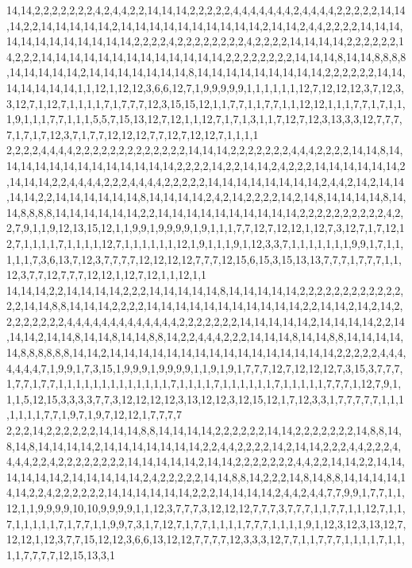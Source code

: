 14,14,2,2,2,2,2,2,2,4,2,4,4,2,2,14,14,14,2,2,2,2,2,4,4,4,4,4,4,4,2,4,4,4,4,2,2,2,2,2,14,14,14,2,2,14,14,14,14,14,2,14,14,14,14,14,14,14,14,14,14,2,14,14,2,4,4,2,2,2,2,14,14,14,14,14,14,14,14,14,14,14,14,2,2,2,2,4,2,2,2,2,2,2,2,2,4,2,2,2,2,14,14,14,14,2,2,2,2,2,2,14,2,2,2,14,14,14,14,14,14,14,14,14,14,14,14,14,2,2,2,2,2,2,2,2,14,14,14,8,14,14,8,8,8,8,14,14,14,14,14,2,14,14,14,14,14,14,14,8,14,14,14,14,14,14,14,14,14,2,2,2,2,2,2,14,14,14,14,14,14,14,1,1,12,1,12,12,3,6,6,12,7,1,9,9,9,9,9,1,1,1,1,1,1,12,7,12,12,12,3,7,12,3,3,12,7,1,12,7,1,1,1,1,7,1,7,7,7,12,3,15,15,12,1,1,7,7,1,1,7,7,1,1,12,12,1,1,1,7,7,1,7,1,1,1,9,1,1,1,7,7,1,1,1,5,5,7,15,13,12,7,12,1,1,12,7,1,7,1,3,1,1,7,12,7,12,3,13,3,3,12,7,7,7,7,1,7,1,7,12,3,7,1,7,7,12,12,12,7,7,12,7,12,12,7,1,1,1,1
2,2,2,2,4,4,4,4,2,2,2,2,2,2,2,2,2,2,2,2,2,14,14,14,2,2,2,2,2,2,2,4,4,4,2,2,2,2,14,14,8,14,14,14,14,14,14,14,14,14,14,14,14,14,2,2,2,2,14,2,2,14,14,2,4,2,2,2,14,14,14,14,14,14,2,14,14,14,2,2,4,4,4,4,2,2,2,4,4,4,4,2,2,2,2,2,14,14,14,14,14,14,14,14,2,4,4,2,14,2,14,14,14,14,2,2,14,14,14,14,14,14,8,14,14,14,14,2,4,2,14,2,2,2,2,14,2,14,8,14,14,14,14,8,14,14,8,8,8,8,14,14,14,14,14,14,2,2,14,14,14,14,14,14,14,14,14,14,2,2,2,2,2,2,2,2,2,2,4,2,2,7,9,1,1,9,12,13,15,12,1,1,9,9,1,9,9,9,9,1,9,1,1,1,7,7,12,7,12,12,1,12,7,3,12,7,1,7,12,12,7,1,1,1,1,7,1,1,1,1,12,7,1,1,1,1,1,1,12,1,9,1,1,1,9,1,12,3,3,7,1,1,1,1,1,1,1,9,9,1,7,1,1,1,1,1,7,3,6,13,7,12,3,7,7,7,7,12,12,12,12,7,7,7,12,15,6,15,3,15,13,13,7,7,7,1,7,7,7,1,1,12,3,7,7,12,7,7,7,12,12,1,12,7,12,1,1,12,1,1
14,14,14,2,2,14,14,14,14,2,2,2,14,14,14,14,14,8,14,14,14,14,14,2,2,2,2,2,2,2,2,2,2,2,2,2,2,14,14,8,8,14,14,14,2,2,2,2,14,14,14,14,14,14,14,14,14,14,14,2,2,14,14,2,14,2,14,2,2,2,2,2,2,2,2,4,4,4,4,4,4,4,4,4,4,4,4,4,2,2,2,2,2,2,2,14,14,14,14,14,2,14,14,14,14,2,2,14,14,14,2,14,14,8,14,14,8,14,14,8,8,14,2,2,4,4,4,2,2,2,14,14,14,8,14,14,8,8,14,14,14,14,14,8,8,8,8,8,8,14,14,2,14,14,14,14,14,14,14,14,14,14,14,14,14,14,14,14,2,2,2,2,2,4,4,4,4,4,4,4,7,1,9,9,1,7,3,15,1,9,9,9,1,9,9,9,9,1,1,9,1,9,1,7,7,7,12,7,12,12,12,7,3,15,3,7,7,7,1,7,7,1,7,7,1,1,1,1,1,1,1,1,1,1,1,1,1,7,1,1,1,1,7,1,1,1,1,1,1,7,1,1,1,1,1,7,7,7,1,12,7,9,1,1,1,5,12,15,3,3,3,3,7,7,3,12,12,12,12,3,13,12,12,3,12,15,12,1,7,12,3,3,1,7,7,7,7,7,1,1,1,1,1,1,1,7,7,1,9,7,1,9,7,12,12,1,7,7,7,7
2,2,2,14,2,2,2,2,2,2,14,14,14,8,8,14,14,14,14,2,2,2,2,2,2,14,14,2,2,2,2,2,2,2,14,8,8,14,8,14,8,14,14,14,14,2,14,14,14,14,14,14,14,2,2,4,4,2,2,2,2,14,2,14,14,2,2,2,4,4,2,2,2,4,4,4,4,2,2,4,2,2,2,2,2,2,2,2,14,14,14,14,14,2,14,14,2,2,2,2,2,2,2,4,4,2,2,14,14,2,2,14,14,14,14,14,14,2,14,14,14,14,14,2,4,2,2,2,2,2,14,14,8,8,14,2,2,2,14,8,14,8,8,14,14,14,14,14,14,2,2,4,2,2,2,2,2,2,14,14,14,14,14,14,2,2,2,14,14,14,14,2,4,4,2,4,4,7,7,9,9,1,7,7,1,1,12,1,1,9,9,9,9,10,10,9,9,9,9,1,1,12,3,7,7,7,3,12,12,12,7,7,7,3,7,7,7,1,1,7,7,1,1,12,7,1,1,7,1,1,1,1,1,7,1,7,7,1,1,9,9,7,3,1,7,12,7,1,7,7,1,1,1,1,7,7,7,1,1,1,1,9,1,12,3,12,3,13,12,7,12,12,1,12,3,7,7,15,12,12,3,6,6,13,12,12,7,7,7,7,12,3,3,3,12,7,7,1,1,7,7,7,1,1,1,1,7,1,1,1,1,7,7,7,7,12,15,13,3,1
